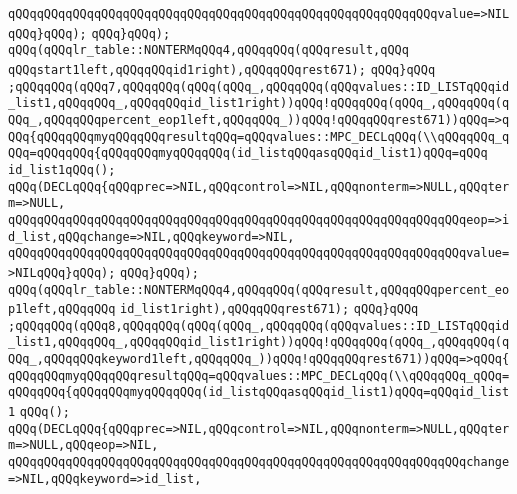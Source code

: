 \verb|qQQqqQQqqQQqqQQqqQQqqQQqqQQqqQQqqQQqqQQqqQQqqQQqqQQqqQQqqQQqvalue=>NILqQQq}qQQq);|\newline
\verb|qQQq}qQQq);|\newline
\verb|qQQq(qQQqlr_table::NONTERMqQQq4,qQQqqQQq(qQQqresult,qQQq|\newline
\verb|qQQqstart1left,qQQqqQQqid1right),qQQqqQQqrest671);|\newline
\verb|qQQq}qQQq|\newline
\verb|;qQQqqQQq(qQQq7,qQQqqQQq(qQQq(qQQq_,qQQqqQQq(qQQqvalues::ID_LISTqQQqid_list1,qQQqqQQq_,qQQqqQQqid_list1right))qQQq!qQQqqQQq(qQQq_,qQQqqQQq(qQQq_,qQQqqQQqpercent_eop1left,qQQqqQQq_))qQQq!qQQqqQQqrest671))qQQq=>qQQq{qQQqqQQqmyqQQqqQQqresultqQQq=qQQqvalues::MPC_DECLqQQq(\\qQQqqQQq_qQQq=qQQqqQQq{qQQqqQQqmyqQQqqQQq(id_listqQQqasqQQqid_list1)qQQq=qQQq|\newline
\verb|id_list1qQQq();|\newline
\verb|qQQq(DECLqQQq{qQQqprec=>NIL,qQQqcontrol=>NIL,qQQqnonterm=>NULL,qQQqterm=>NULL,|\newline
\verb|qQQqqQQqqQQqqQQqqQQqqQQqqQQqqQQqqQQqqQQqqQQqqQQqqQQqqQQqqQQqqQQqeop=>id_list,qQQqchange=>NIL,qQQqkeyword=>NIL,|\newline
\verb|qQQqqQQqqQQqqQQqqQQqqQQqqQQqqQQqqQQqqQQqqQQqqQQqqQQqqQQqqQQqqQQqvalue=>NILqQQq}qQQq);|\newline
\verb|qQQq}qQQq);|\newline
\verb|qQQq(qQQqlr_table::NONTERMqQQq4,qQQqqQQq(qQQqresult,qQQqqQQqpercent_eop1left,qQQqqQQq|\newline
\verb|id_list1right),qQQqqQQqrest671);|\newline
\verb|qQQq}qQQq|\newline
\verb|;qQQqqQQq(qQQq8,qQQqqQQq(qQQq(qQQq_,qQQqqQQq(qQQqvalues::ID_LISTqQQqid_list1,qQQqqQQq_,qQQqqQQqid_list1right))qQQq!qQQqqQQq(qQQq_,qQQqqQQq(qQQq_,qQQqqQQqkeyword1left,qQQqqQQq_))qQQq!qQQqqQQqrest671))qQQq=>qQQq{qQQqqQQqmyqQQqqQQqresultqQQq=qQQqvalues::MPC_DECLqQQq(\\qQQqqQQq_qQQq=qQQqqQQq{qQQqqQQqmyqQQqqQQq(id_listqQQqasqQQqid_list1)qQQq=qQQqid_list1|\newline
\verb|qQQq();|\newline
\verb|qQQq(DECLqQQq{qQQqprec=>NIL,qQQqcontrol=>NIL,qQQqnonterm=>NULL,qQQqterm=>NULL,qQQqeop=>NIL,|\newline
\verb|qQQqqQQqqQQqqQQqqQQqqQQqqQQqqQQqqQQqqQQqqQQqqQQqqQQqqQQqqQQqqQQqchange=>NIL,qQQqkeyword=>id_list,|\newline
